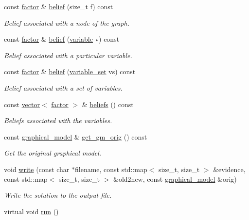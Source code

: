\begin{DoxyCompactItemize}
const \hyperlink{classmerlin_1_1factor}{factor} \& \hyperlink{classmerlin_1_1wmb_aeb4e3096861b442f85ad8d1344172d18}{belief} (size\+\_\+t f) const 
\begin{DoxyCompactList}\small\item\em Belief associated with a node of the graph. \end{DoxyCompactList}\item 
const \hyperlink{classmerlin_1_1factor}{factor} \& \hyperlink{classmerlin_1_1wmb_a93588ec46d0cc1e54179ce8555862941}{belief} (\hyperlink{classmerlin_1_1variable}{variable} v) const 
\begin{DoxyCompactList}\small\item\em Belief associated with a particular variable. \end{DoxyCompactList}\item 
const \hyperlink{classmerlin_1_1factor}{factor} \& \hyperlink{classmerlin_1_1wmb_afe50fb8a9334a9f8b4653a75f20abd30}{belief} (\hyperlink{classmerlin_1_1variable__set}{variable\+\_\+set} vs) const 
\begin{DoxyCompactList}\small\item\em Belief associated with a set of variables. \end{DoxyCompactList}\item 
const \hyperlink{classmerlin_1_1vector}{vector}$<$ \hyperlink{classmerlin_1_1factor}{factor} $>$ \& \hyperlink{classmerlin_1_1wmb_ab433dc54ee1777fa163af30aa71bde3d}{beliefs} () const 
\begin{DoxyCompactList}\small\item\em Beliefs associated with the variables. \end{DoxyCompactList}\item 
\hypertarget{classmerlin_1_1wmb_a5060018ee2950dac945e4efcb21a36d1}{}const \hyperlink{classmerlin_1_1graphical__model}{graphical\+\_\+model} \& \hyperlink{classmerlin_1_1wmb_a5060018ee2950dac945e4efcb21a36d1}{get\+\_\+gm\+\_\+orig} () const \label{classmerlin_1_1wmb_a5060018ee2950dac945e4efcb21a36d1}

\begin{DoxyCompactList}\small\item\em Get the original graphical model. \end{DoxyCompactList}\item 
void \hyperlink{classmerlin_1_1wmb_ae994f02e87676b7613aba354a61b0a73}{write} (const char $\ast$filename, const std\+::map$<$ size\+\_\+t, size\+\_\+t $>$ \&evidence, const std\+::map$<$ size\+\_\+t, size\+\_\+t $>$ \&old2new, const \hyperlink{classmerlin_1_1graphical__model}{graphical\+\_\+model} \&orig)
\begin{DoxyCompactList}\small\item\em Write the solution to the output file. \end{DoxyCompactList}\item 
\hypertarget{classmerlin_1_1wmb_acdbdfbded7a99152f8e7215c57cf1ab5}{}virtual void \hyperlink{classmerlin_1_1wmb_acdbdfbded7a99152f8e7215c57cf1ab5}{run} ()\label{classmerlin_1_1wmb_acdbdfbded7a99152f8e7215c57cf1ab5}


\end{DoxyCompactItemize}
